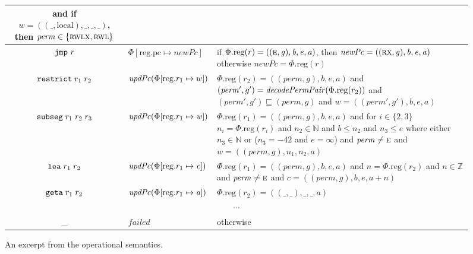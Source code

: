 \documentclass[format=acmsmall, review=true, screen=true]{acmart}
\newcommand{\update}[2]{[#1 \mapsto #2]}
\newcommand{\var}[1]{\mathit{#1}}
\newcommand{\rv}{\var{r}}
\newcommand{\lv}{\var{r}}
\newcommand{\gl}{\var{g}}
\newcommand{\pcreg}{\mathrm{pc}}
\newcommand{\addr}{\var{a}}
\newcommand{\start}{\var{b}}
\newcommand{\addrend}{\var{e}}
\newcommand{\perm}{\var{perm}}
\newcommand{\inftyend}{-42}
\newcommand{\stdcap}[1][(\perm,\gl)]{\left(#1,\start,\addrend,\addr \right)}
\newcommand{\plainproj}[1]{\mathrm{#1}}
\newcommand{\memreg}[1][\Phi]{#1.\plainproj{reg}}
\newcommand{\updateReg}[3][\Phi]{#1\update{\plainproj{reg}.#2}{#3}}
\newcommand{\failed}{\mathit{failed}}
\newcommand{\plainfun}[2]{
  \ifthenelse{\equal{#2}{}}
  {\mathit{#1}}
  {\mathit{#1}(#2)}
}
\newcommand{\decodePermPair}{\plainfun{decodePermPair}}
\newcommand{\stdUpdatePc}[1]{\plainfun{updPc}{#1}}
\newcommand{\nats}{\mathbb{N}}
\newcommand{\ints}{\mathbb{Z}}
\newcommand{\refreg}[1]{#1}
\newcommand{\zinstr}[1]{\mathtt{#1}}
\newcommand{\oneinstr}[2]{
  \ifthenelse{\equal{#2}{}}
  {\zinstr{#1}}
  {\zinstr{#1} \; #2}
}
\newcommand{\jmp}[1]{\oneinstr{jmp}{#1}}
\newcommand{\twoinstr}[3]{
  \ifthenelse{\equal{#2#3}{}}
  {\zinstr{#1}}
  {\zinstr{#1} \; #2 \; #3}
}
\newcommand{\restricttwo}[2]{\twoinstr{restrict}{#1}{#2}}
\newcommand{\geta}[2]{\twoinstr{geta}{#1}{#2}}
\newcommand{\lea}[2]{\twoinstr{lea}{#1}{#2}}
\newcommand{\threeinstr}[4]{
  \ifthenelse{\equal{#2#3#4}{}}
  {\zinstr{#1}}
  {\zinstr{#1} \; #2 \; #3 \; #4}
}
\newcommand{\subseg}[3]{\threeinstr{subseg}{#1}{#2}{#3}}
\newcommand{\plainperm}[1]{\textsc{#1}}
\newcommand{\exec}{\plainperm{rx}}
\newcommand{\entry}{\plainperm{e}}
\newcommand{\readwritel}{\plainperm{rwl}}
\newcommand{\rwlx}{\plainperm{rwlx}}
\newcommand{\plainlocality}[1]{\mathrm{#1}}
\newcommand{\local}{\plainlocality{local}}
\newcommand{\itoplas}[1]{#1}
\begin{document}
\begin{figure}[htb]
\begin{tabular}{|c|p{3.4cm}|>{\raggedright\arraybackslash}p{7.3cm}|}
                                                                                       and if $\var{w} = ((\_,\local),\_,\_,\_)$, then $\perm \in \{\rwlx,\readwritel \}$\\
    \hline
    $\jmp{\lv}$&$\updateReg{\pcreg}{\var{newPc}}$& if $\memreg(r) = ((\entry,\gl),\start,\addrend,\addr)$, then $\var{newPc} = ((\exec,\gl),\start,\addrend,\addr)$ otherwise $\var{newPc} = \memreg(r)$\\
    \hline
    $\restricttwo{\refreg{r_1}}{r_2}$&$\stdUpdatePc{}(\updateReg{r_1}{w})$  & $\memreg(r_2) = \stdcap$ and $(\perm',g') = \decodePermPair{\memreg(r_2)}$
                                                                              and $(\perm',g') \sqsubseteq (\perm,g)$ and  $w =((\perm',g'),\start,\addrend,\addr)$\\
    \hline
    \itoplas{$\subseg{\refreg{r_1}}{r_2}{r_3}$} & \itoplas{$\stdUpdatePc{\updateReg{r_1}{\var{w}}}$} &  \itoplas{$\memreg(r_1) = \stdcap$ and for $i \in \{2,3\}$ $n_i = \memreg(\rv_i)$ and $n_2 \in \nats$ and $\start \leq n_2$ and $n_3 \leq \addrend$ where either $n_3 \in \nats$ or ($n_3=\inftyend$ and $\addrend = \infty$) and $\perm \neq \entry$ and $w = ((\perm,\gl),n_1,n_2,\addr)$}\\
    \hline
    \itoplas{$\lea{\refreg{r_1}}{r_2}$} & \itoplas{$\stdUpdatePc{\updateReg{r_1}{\var{c}}}$} &\itoplas{$\memreg(r_1) = \stdcap$ and $n = \memreg(r_2)$ and $n \in \ints $ and $\perm \neq \entry$ and $\var{c} = ((\perm,\gl),\start,\addrend,\addr + n)$} \\
    \hline
    $\geta{\refreg{r_1}}{\refreg{r_2}}$ & $\stdUpdatePc{\updateReg{r_1}{\addr}}$ &
                                                $\memreg(r_2) = ((\_,\_),\_,\_,\addr)$\\
    \hline
    \multicolumn{3}{|c|}{$\cdots$}\\
    \hline
    \_&$\failed$&otherwise\\
    \hline
  \end{tabular}
  \caption{An excerpt from the operational semantics.}
  \label{fig:op-sem}
\end{figure}
\end{document}
